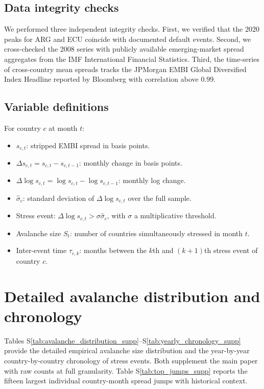 \documentclass[11pt,a4paper]{article}
\begin{document}
\subsection{Data integrity checks}
We performed three independent integrity checks. First, we verified that the
2020 peaks for ARG and ECU coincide with documented default events. Second,
we cross-checked the 2008 series with publicly available emerging-market
spread aggregates from the IMF International Financial Statistics. Third,
the time-series of cross-country mean spreads tracks the JPMorgan EMBI
Global Diversified Index Headline reported by Bloomberg with correlation
above 0.99.

\subsection{Variable definitions}
For country $c$ at month $t$:
\begin{itemize}
\item $s_{c,t}$: stripped EMBI spread in basis points.
\item $\Delta s_{c,t} = s_{c,t} - s_{c,t-1}$: monthly change in basis points.
\item $\Delta\log s_{c,t} = \log s_{c,t} - \log s_{c,t-1}$: monthly log change.
\item $\hat{\sigma}_c$: standard deviation of $\Delta\log s_{c,t}$ over the full sample.
\item Stress event: $\Delta\log s_{c,t} > \sigma\hat{\sigma}_c$, with $\sigma$ a multiplicative threshold.
\item Avalanche size $S_t$: number of countries simultaneously stressed in month $t$.
\item Inter-event time $\tau_{c,k}$: months between the $k$th and $(k{+}1)$th stress event of country $c$.
\end{itemize}

\section{Detailed avalanche distribution and chronology}
\label{sec:avalanche_detail}

Tables S\ref{tab:avalanche_distribution_supp}--S\ref{tab:yearly_chronology_supp}
provide the detailed empirical avalanche size distribution and the year-by-year
country-by-country chronology of stress events. Both supplement the main paper
with raw counts at full granularity. Table S\ref{tab:top_jumps_supp} reports
the fifteen largest individual country-month spread jumps with historical
context.
\end{document}
